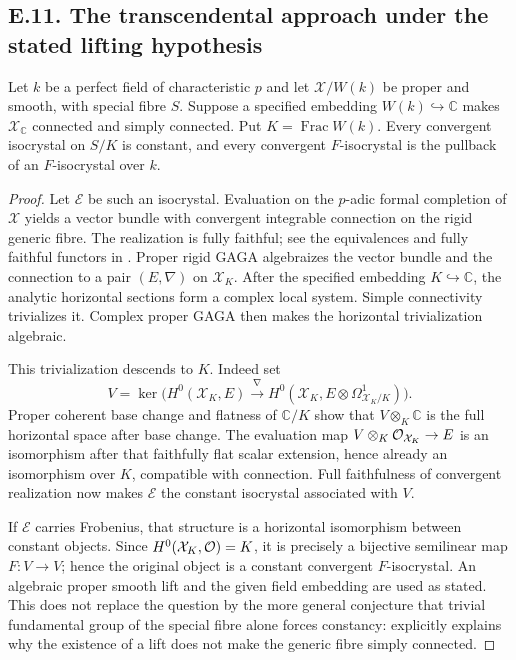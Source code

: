 \subsection{E.11. The transcendental approach under the stated lifting hypothesis}

\begin{theorem}\label{thm:DE-simply-connected-convergent}
Let $k$ be a perfect field of characteristic $p$ and let $\mathcal X/W(k)$ be proper and smooth, with special fibre $S$.  Suppose a specified embedding $W(k)\hookrightarrow\mathbb C$ makes $\mathcal X_{\mathbb C}$ connected and simply connected.  Put $K=\operatorname{Frac}W(k)$.  Every convergent isocrystal on $S/K$ is constant, and every convergent $F$-isocrystal is the pullback of an $F$-isocrystal over $k$.
\end{theorem}
\begin{proof}
Let $\mathcal E$ be such an isocrystal.  Evaluation on the $p$-adic formal completion of $\mathcal X$ yields a vector bundle with convergent integrable connection on the rigid generic fibre.  The realization is fully faithful; see the equivalences and fully faithful functors in \cite[\S1, (1.13), (1.24)--(1.26)]{EsnaultShiho2018}.  Proper rigid GAGA algebraizes the vector bundle and the connection to a pair $(E,\nabla)$ on $\mathcal X_K$.  After the specified embedding $K\hookrightarrow\mathbb C$, the analytic horizontal sections form a complex local system.  Simple connectivity trivializes it.  Complex proper GAGA then makes the horizontal trivialization algebraic.

This trivialization descends to $K$.  Indeed set
\[
 V=\ker\bigl(H^0(\mathcal X_K,E)\xrightarrow{\nabla}
                H^0(\mathcal X_K,E\otimes\Omega^1_{\mathcal X_K/K})\bigr).
\]
Proper coherent base change and flatness of $\mathbb C/K$ show that $V\otimes_K\mathbb C$ is the full horizontal space after base change.  The evaluation map $V\otimes_K\mathcal O_{\mathcal X_K}\to E$ is an isomorphism after that faithfully flat scalar extension, hence already an isomorphism over $K$, compatible with connection.  Full faithfulness of convergent realization now makes $\mathcal E$ the constant isocrystal associated with $V$.

If $\mathcal E$ carries Frobenius, that structure is a horizontal isomorphism between constant objects.  Since $H^0(\mathcal X_K,\mathcal O)=K$, it is precisely a bijective semilinear map $F:V\to V$; hence the original object is a constant convergent $F$-isocrystal.  An algebraic proper smooth lift and the given field embedding are used as stated.  This does not replace the question by the more general conjecture that trivial \etale fundamental group of the special fibre alone forces constancy: \cite[Introduction]{EsnaultShiho2018} explicitly explains why the existence of a lift does not make the generic fibre simply connected.
\end{proof}

